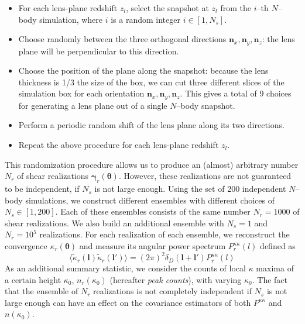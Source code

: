 \documentclass[reprint,aps,prd,superscriptaddress,showkeys,showpacs]{revtex4-1}
\newcommand{\bb}[1]{\mathbf{#1}}
\begin{document}
\begin{itemize}
\item For each lens-plane redshift $z_l$, select the snapshot at $z_l$ from the $i$--th $N$--body simulation, where $i$ is a random integer $i\in [1,N_s]$.
\item Choose randomly between the three orthogonal directions ${\bb{n}_x,\bb{n}_y,\bb{n}_z}$: the lens plane will be perpendicular to this direction.
\item Choose the position of the plane along the snapshot: because the lens thickness is 1/3 the size of the box, we can cut three different slices of the simulation box for each orientation ${\bb{n}_x,\bb{n}_y,\bb{n}_z}$. This gives a total of 9 choices for generating a lens plane out of a single $N$--body snapshot.
\item Perform a periodic random shift of the lens plane along its two directions.
\item Repeat the above procedure for each lens-plane redshift $z_l$.
\end{itemize}  
%
This randomization procedure allows us to produce an (almost)
arbitrary number $N_r$ of shear realizations
$\pmb{\gamma}_r(\pmb{\theta})$. However, these realizations are not
guaranteed to be independent, if $N_s$ is not large enough. Using the
set of 200 independent $N$--body simulations, we construct different
ensembles with different choices of $N_s\in[1,200]$. Each of these
ensembles consists of the same number $N_r=1000$ of shear
realizations. We also build an additional ensemble with $N_s=1$ and
$N_r=10^5$ realizations. For each realization of each ensemble, we
reconstruct the convergence $\kappa_r(\pmb{\theta})$ 
and measure its
angular power spectrum $P^{\kappa\kappa}_r(l)$ defined as
\begin{equation}
\langle\tilde{\kappa}_r(\bb{l})\tilde{\kappa}_r(\bb{l}')\rangle = (2\pi)^2\delta_D(\bb{l}+\bb{l}')P^{\kappa\kappa}_r(l)
\end{equation}
%
As an additional summary statistic, we consider the counts of local
$\kappa$ maxima of a certain height $\kappa_0$, $n_r(\kappa_0)$
(hereafter \textit{peak counts}), with varying $\kappa_0$.
The fact that the ensemble of $N_r$ realizations is not completely
independent if $N_s$ is not large enough can have an effect on the
covariance estimators of both $P^{\kappa\kappa}$ and $n(\kappa_0)$.
\end{document}
